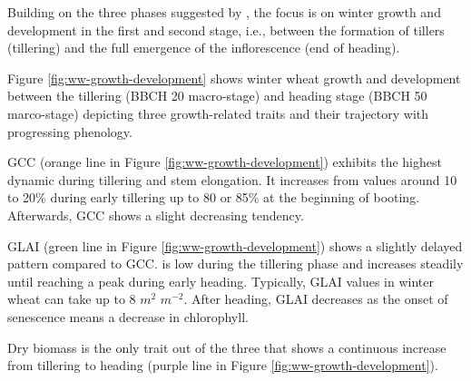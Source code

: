 Building on the three phases suggested by \cite{kirby_analysis_1988}, the focus is on winter growth and development in the first and second stage, i.e., between the formation of tillers (tillering) and the full emergence of the inflorescence (end of heading). %

Figure \ref{fig:ww-growth-development} shows winter wheat growth and development between the tillering (\gls{BBCH} 20 macro-stage) and heading stage (\gls{BBCH} 50 marco-stage) depicting three growth-related traits and their trajectory with progressing phenology.

\gls{GCC} (orange line in Figure \ref{fig:ww-growth-development}) exhibits the highest dynamic during tillering and stem elongation. It increases from values around 10 to 20\% during early tillering up to 80 or 85\% at the beginning of booting. Afterwards, \gls{GCC} shows a slight decreasing tendency. %

\gls{GLAI} (green line in Figure \ref{fig:ww-growth-development}) shows a slightly delayed pattern compared to GCC. is low during the tillering phase and increases steadily until reaching a peak during early heading. Typically, \gls{GLAI} values in winter wheat can take up to 8 $m^2$ $m^{-2}$. After heading, \gls{GLAI} decreases as the onset of senescence means a decrease in chlorophyll.

Dry biomass is the only trait out of the three that shows a continuous increase from tillering to heading (purple line in Figure \ref{fig:ww-growth-development}).

